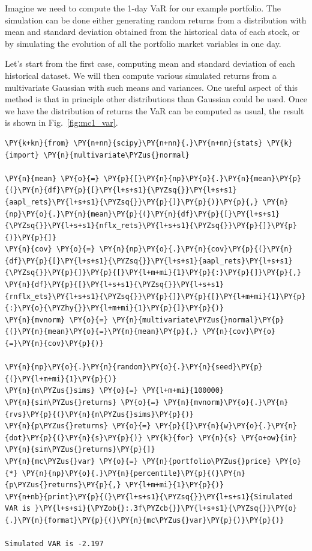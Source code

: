 Imagine we need to compute the 1-day VaR for our example portfolio.
The simulation can be done either generating random returns from a distribution with mean and standard deviation obtained from the historical data of each stock, or by simulating the evolution of all the portfolio market variables in one day.

Let's start from the first case, computing mean and standard deviation of each historical dataset. We will then compute various simulated returns from a multivariate Gaussian with such means and variances. 
One useful aspect of this method is that in principle other distributions than Gaussian could be used.
Once we have the distribution of returns the VaR can be computed as usual, the result is shown in Fig.~\ref{fig:mc1_var}.

\begin{codebox}
\begin{Verbatim}[commandchars=\\\{\}]
\PY{k+kn}{from} \PY{n+nn}{scipy}\PY{n+nn}{.}\PY{n+nn}{stats} \PY{k}{import} \PY{n}{multivariate\PYZus{}normal}

\PY{n}{mean} \PY{o}{=} \PY{p}{[}\PY{n}{np}\PY{o}{.}\PY{n}{mean}\PY{p}{(}\PY{n}{df}\PY{p}{[}\PY{l+s+s1}{\PYZsq{}}\PY{l+s+s1}{aapl_rets}\PY{l+s+s1}{\PYZsq{}}\PY{p}{]}\PY{p}{)}\PY{p}{,} \PY{n}{np}\PY{o}{.}\PY{n}{mean}\PY{p}{(}\PY{n}{df}\PY{p}{[}\PY{l+s+s1}{\PYZsq{}}\PY{l+s+s1}{nflx_rets}\PY{l+s+s1}{\PYZsq{}}\PY{p}{]}\PY{p}{)}\PY{p}{]}
\PY{n}{cov} \PY{o}{=} \PY{n}{np}\PY{o}{.}\PY{n}{cov}\PY{p}{(}\PY{n}{df}\PY{p}{[}\PY{l+s+s1}{\PYZsq{}}\PY{l+s+s1}{aapl_rets}\PY{l+s+s1}{\PYZsq{}}\PY{p}{]}\PY{p}{[}\PY{l+m+mi}{1}\PY{p}{:}\PY{p}{]}\PY{p}{,} \PY{n}{df}\PY{p}{[}\PY{l+s+s1}{\PYZsq{}}\PY{l+s+s1}{rnflx_ets}\PY{l+s+s1}{\PYZsq{}}\PY{p}{]}\PY{p}{[}\PY{l+m+mi}{1}\PY{p}{:}\PY{o}{\PYZhy{}}\PY{l+m+mi}{1}\PY{p}{]}\PY{p}{)}		
\PY{n}{mvnorm} \PY{o}{=} \PY{n}{multivariate\PYZus{}normal}\PY{p}{(}\PY{n}{mean}\PY{o}{=}\PY{n}{mean}\PY{p}{,} \PY{n}{cov}\PY{o}{=}\PY{n}{cov}\PY{p}{)}
		
\PY{n}{np}\PY{o}{.}\PY{n}{random}\PY{o}{.}\PY{n}{seed}\PY{p}{(}\PY{l+m+mi}{1}\PY{p}{)}
\PY{n}{n\PYZus{}sims} \PY{o}{=} \PY{l+m+mi}{100000}
\PY{n}{sim\PYZus{}returns} \PY{o}{=} \PY{n}{mvnorm}\PY{o}{.}\PY{n}{rvs}\PY{p}{(}\PY{n}{n\PYZus{}sims}\PY{p}{)}
\PY{n}{p\PYZus{}returns} \PY{o}{=} \PY{p}{[}\PY{n}{w}\PY{o}{.}\PY{n}{dot}\PY{p}{(}\PY{n}{s}\PY{p}{)} \PY{k}{for} \PY{n}{s} \PY{o+ow}{in} \PY{n}{sim\PYZus{}returns}\PY{p}{]}
\PY{n}{mc\PYZus{}var} \PY{o}{=} \PY{n}{portfolio\PYZus{}price} \PY{o}{*} \PY{n}{np}\PY{o}{.}\PY{n}{percentile}\PY{p}{(}\PY{n}{p\PYZus{}returns}\PY{p}{,} \PY{l+m+mi}{1}\PY{p}{)}
\PY{n+nb}{print}\PY{p}{(}\PY{l+s+s1}{\PYZsq{}}\PY{l+s+s1}{Simulated VAR is }\PY{l+s+si}{\PYZob{}:.3f\PYZcb{}}\PY{l+s+s1}{\PYZsq{}}\PY{o}{.}\PY{n}{format}\PY{p}{(}\PY{n}{mc\PYZus{}var}\PY{p}{)}\PY{p}{)}

Simulated VAR is -2.197
\end{Verbatim}
\end{codebox}

